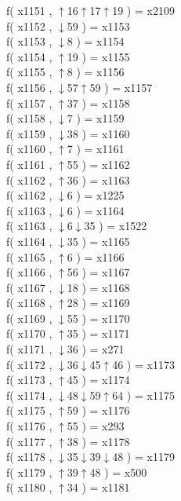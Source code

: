 f( x1151 , $\uparrow$16$\uparrow$17$\uparrow$19 ) = x2109 \\
f( x1152 , $\downarrow$59 ) = x1153 \\
f( x1153 , $\downarrow$8 ) = x1154 \\
f( x1154 , $\uparrow$19 ) = x1155 \\
f( x1155 , $\uparrow$8 ) = x1156 \\
f( x1156 , $\downarrow$57$\uparrow$59 ) = x1157 \\
f( x1157 , $\uparrow$37 ) = x1158 \\
f( x1158 , $\downarrow$7 ) = x1159 \\
f( x1159 , $\downarrow$38 ) = x1160 \\
f( x1160 , $\uparrow$7 ) = x1161 \\
f( x1161 , $\uparrow$55 ) = x1162 \\
f( x1162 , $\uparrow$36 ) = x1163 \\
f( x1162 , $\downarrow$6 ) = x1225 \\
f( x1163 , $\downarrow$6 ) = x1164 \\
f( x1163 , $\downarrow$6$\downarrow$35 ) = x1522 \\
f( x1164 , $\downarrow$35 ) = x1165 \\
f( x1165 , $\uparrow$6 ) = x1166 \\
f( x1166 , $\uparrow$56 ) = x1167 \\
f( x1167 , $\downarrow$18 ) = x1168 \\
f( x1168 , $\uparrow$28 ) = x1169 \\
f( x1169 , $\downarrow$55 ) = x1170 \\
f( x1170 , $\uparrow$35 ) = x1171 \\
f( x1171 , $\downarrow$36 ) = x271 \\
f( x1172 , $\downarrow$36$\downarrow$45$\uparrow$46 ) = x1173 \\
f( x1173 , $\uparrow$45 ) = x1174 \\
f( x1174 , $\downarrow$48$\downarrow$59$\uparrow$64 ) = x1175 \\
f( x1175 , $\uparrow$59 ) = x1176 \\
f( x1176 , $\uparrow$55 ) = x293 \\
f( x1177 , $\uparrow$38 ) = x1178 \\
f( x1178 , $\downarrow$35$\downarrow$39$\downarrow$48 ) = x1179 \\
f( x1179 , $\uparrow$39$\uparrow$48 ) = x500 \\
f( x1180 , $\uparrow$34 ) = x1181 \\
